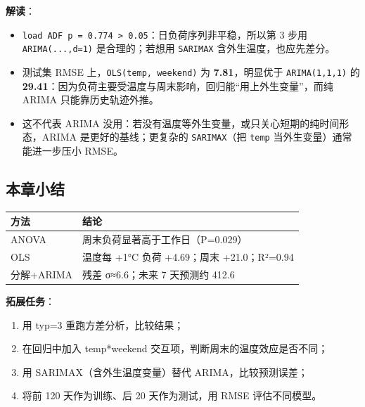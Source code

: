 \begin{Shaded}
\begin{Highlighting}[]
\end{Highlighting}
\end{Shaded}

\textbf{解读}：

\begin{itemize}
\tightlist
\item
  \texttt{load\ ADF\ p\ =\ 0.774\ \textgreater{}\ 0.05}：日负荷序列非平稳，所以第
  3 步用 \texttt{ARIMA(...,d=1)} 是合理的；若想用 \texttt{SARIMAX}
  含外生温度，也应先差分。
\item
  测试集 RMSE 上，\texttt{OLS(temp,\ weekend)} 为
  \textbf{7.81}，明显优于 \texttt{ARIMA(1,1,1)} 的
  \textbf{29.41}：因为负荷主要受温度与周末影响，回归能``用上外生变量''，而纯
  ARIMA 只能靠历史轨迹外推。
\item
  这不代表 ARIMA
  没用：若没有温度等外生变量，或只关心短期的纯时间形态，ARIMA
  是更好的基线；更复杂的 \texttt{SARIMAX}（把 \texttt{temp}
  当外生变量）通常能进一步压小 RMSE。
\end{itemize}

\subsection{本章小结}\label{ux672cux7ae0ux5c0fux7ed3}

{\def\LTcaptype{none} %
\begin{longtable}[]{@{}ll@{}}
\toprule\noalign{}
方法 & 结论 \\
\midrule\noalign{}
\endhead
\bottomrule\noalign{}
\endlastfoot
ANOVA & 周末负荷显著高于工作日（P=0.029） \\
OLS & 温度每 +1°C 负荷 +4.69；周末 +21.0；R²=0.94 \\
分解+ARIMA & 残差 σ≈6.6；未来 7 天预测约 412.6 \\
\end{longtable}
}

\textbf{拓展任务}：

\begin{enumerate}
\def\labelenumi{\arabic{enumi}.}
\tightlist
\item
  用 typ=3 重跑方差分析，比较结果；
\item
  在回归中加入 temp*weekend 交互项，判断周末的温度效应是否不同；
\item
  用 SARIMAX（含外生温度变量）替代 ARIMA，比较预测误差；
\item
  将前 120 天作为训练、后 20 天作为测试，用 RMSE 评估不同模型。
\end{enumerate}

